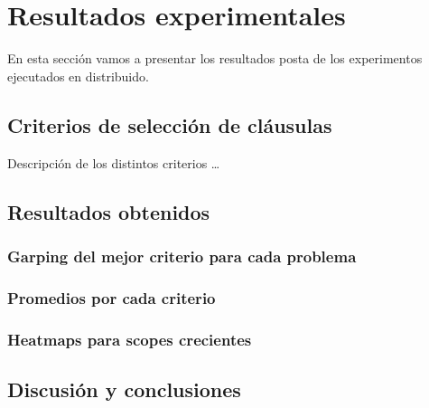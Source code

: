 \section{Resultados experimentales}

En esta sección vamos a presentar los resultados posta de los experimentos
ejecutados en distribuido.

\subsection{Criterios de selección de cláusulas}

Descripción de los distintos criterios \ldots

\subsection{Resultados obtenidos}

\subsubsection{Garping del mejor criterio para cada problema}

\subsubsection{Promedios por cada criterio}

\subsubsection{Heatmaps para scopes crecientes}


\subsection{Discusión y conclusiones}


\newpage

